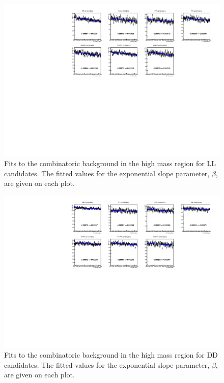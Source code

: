 \begin{figure}[h]
\centering
\includegraphics[width=\linewidth]{figures/fitComponents/combinatoricFits_LL.pdf}
\caption{Fits to the combinatoric background in the high \Bm mass region for LL candidates. The fitted values for the exponential slope parameter, $\beta$, are given on each plot.}
\label{combinatoricLL}
\end{figure}

\begin{figure}[h]
\centering
\includegraphics[width=\linewidth]{figures/fitComponents/combinatoricFits_DD.pdf}
\caption{Fits to the combinatoric background in the high \Bm mass region for DD candidates. The fitted values for the exponential slope parameter, $\beta$, are given on each plot.}
\label{combinatoricDD}
\end{figure}


